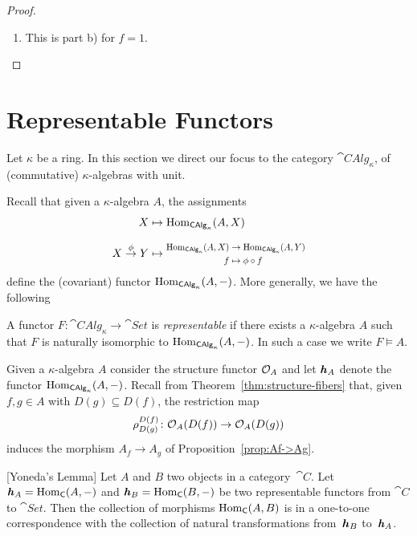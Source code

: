 \begin{proof}
\begin{enumerate}[\rm a)]
        \item This is part b) for $f=1$.
    \end{enumerate}
\end{proof}

\section{Representable Functors}

Let $\kappa$ be a ring. In this section we direct our focus to the category $\cat{CAlg}_\kappa$, of (commutative) $\kappa$-algebras with unit.

Recall that given a $\kappa$-algebra $A$, the assignments
\begin{align*}
    X&\mapsto\Hom_{\cat{CAlg}_\kappa}(A,X)\\[0.1in]
    X\stackrel{\phi}{\to}Y&\mapsto\scalemath{0.8}{\begin{aligned}
        \Hom_{\cat{CAlg}_\kappa}(A,X)&\to\Hom_{\cat{CAlg}_\kappa}(A,Y)\\
        f&\mapsto\phi\circ f
    \end{aligned}}
\end{align*}
define the (covariant) functor ${\rm Hom}_{\mathsf{CAlg}_\kappa}(A,-)$. More generally, we have the following

\begin{defn}
    A functor $F\colon\cat{CAlg}_\kappa\to\cat{Set}$ is \textsl{representable} if there exists a $\kappa$-algebra $A$ such that $F$ is naturally isomorphic to ${\rm Hom}_{\mathsf{CAlg}_\kappa}(A,-)$. In such a case we write $F\models A$.
\end{defn}

\begin{rem}
    Given a $\kappa$-algebra $A$ consider the structure functor $\mathcal O_{A}$ and let $\textrm{\boldmath$\mathit h$}_A$ denote the functor ${\rm Hom}_{\mathsf{CAlg}_\kappa}(A,-)$. Recall from Theorem~\ref{thm:structure-fibers} that, given $f,g\in A$ with $D(g)\subseteq D(f)$, the restriction map
    $$
        \rho^{D(f)}_{D(g)}\colon\mathcal O_{A}(D(f))\to\mathcal O_{A}(D(g))
    $$
    induces the morphism $A_f\to A_g$ of Proposition~\ref{prop:Af->Ag}.
\end{rem}

\begin{thm}\label{thm:yoneda}
    {\rm[Yoneda’s Lemma]} Let\/ $A$ and\/ $B$ two objects in a category\/~$\cat C$. Let\/ $\textrm{\boldmath$\mathit h$}_A={\rm Hom}_{\mathsf{C}}(A,-)$ and\/ $\textrm{\boldmath$\mathit h$}_B={\rm Hom}_{\mathsf{C}}(B,-)$ be two representable functors from\/ $\cat C$ to\/ $\cat{Set}$. Then the collection of morphisms\/ ${\rm Hom}_{\mathsf{C}}(A,B)$ is in a one-to-one correspondence with the collection of natural transformations from\/~$\textrm{\boldmath$\mathit h$}_B$ to\/~$\textrm{\boldmath$\mathit h$}_A$.
\end{thm}

